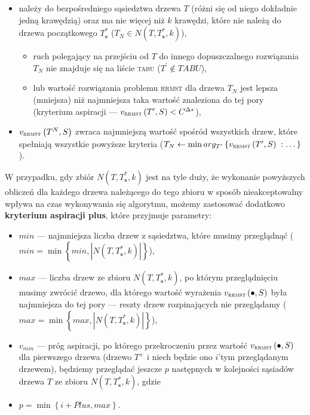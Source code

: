 \begin{itemize}
	\item należy do bezpośredniego sąsiedztwa drzewa $T$ (różni się od niego dokładnie jedną krawędzią) oraz ma nie więcej niż $k$ krawędzi, które nie należą do drzewa początkowego $T^{\ast}_{\textbf{s}}$ ($T_{N} \in N \left( T, T^{\ast}_{\textbf{s}}, k \right)$),
	\begin{itemize}
		\item ruch polegający na przejściu od $T$ do innego dopuszczalnego rozwiązania $T_{N}$ nie znajduje się na liście \textsc{tabu} ($T^{\prime} \notin TABU$),
		\item lub wartość rozwiązania problemu \textsc{rrmst} dla drzewa $T_{N}$ jest lepsza (mniejsza) niż najmniejsza taka wartość znaleziona do tej pory (kryterium aspiracji --- $v_{\textsc{rrmst}} \left( T^{\prime}, S \right) < C^{\Delta\ast}$), 
	\end{itemize}
	\item $v_{\textsc{rrmst}} \left( T^{N}, S \right)$ zwraca najmniejszą wartość spośród wszystkich drzew, które spełniają wszystkie powyższe kryteria ($T_{N} \leftarrow \min arg_{T^{\prime}} \left\{ v_{\textsc{rrmst}} \left( T^{\prime}, S \right) \; : \dots \right\}$).
\end{itemize}

W przypadku, gdy zbiór $N \left( T, T^{\ast}_{\textbf{s}}, k \right)$ jest na tyle duży, że wykonanie powyższych obliczeń dla każdego drzewa należącego do tego zbioru w sposób nieakceptowalny wpływa na czas wykonywania się algorytmu, możemy zastosować dodatkowo \textbf{kryterium aspiracji plus}, które przyjmuje parametry:

\begin{itemize}
	\item $min$ --- najmniejsza liczba drzew z sąsiedztwa, które musimy przeglądnąć ($min = \min \left\{ min, \left| N \left( T, T^{\ast}_{\textbf{s}}, k \right) \right| \right\}$),
	\item $max$ --- liczba drzew ze zbioru $N \left( T, T^{\ast}_{\textbf{s}}, k \right)$, po którym przeglądnięciu musimy zwrócić drzewo, dla którego wartość wyrażenia $v_{\textsc{rrmst}} \left( \bullet, S \right)$ była najmniejsza do tej pory --- reszty drzew rozpinających nie przeglądamy ($max = \min \left\{ max, \left| N \left( T, T^{\ast}_{\textbf{s}}, k \right) \right| \right\}$),
	\item $v_{min}$ --- próg aspiracji, po którego przekroczeniu przez wartość $v_{\textsc{rrmst}} \left( \bullet, S \right)$ dla pierwszego drzewa (drzewo $T^{+}$ i niech będzie ono $i$'tym przeglądanym drzewem), będziemy przeglądać jeszcze $p$ następnych w kolejności sąsiadów drzewa $T$ ze zbioru $N \left( T, T^{\ast}_{\textbf{s}}, k \right)$, gdzie
	\item $p = \min \left\{ i + Plus, max \right\}$.
\end{itemize}

